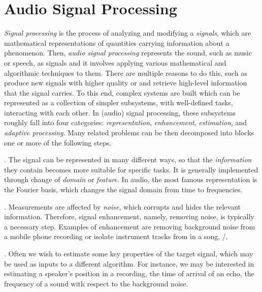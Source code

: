 \section{Audio Signal Processing}\label{sec:intro:processing}
\textit{Signal processing} is the process of analyzing and modifying a \textit{signals}, which are mathematical representations of quantities carrying information about a phenomenon.
Then, \textit{audio signal processing} represents the sound, such as music or speech, as signals
 and it involves applying various mathematical and algorithmic techniques to them.
There are multiple reasons to do this, such as produce new signals with higher quality or and retrieve high-level information that the signal carries.
To this end, complex systems are built which can be represented as a collection of simpler subsystems, with well-defined tasks, interacting with each other.
In (audio) signal processing, these subsystems roughly fall into four categories: \textit{representation}, \textit{enhancement}, \textit{estimation}, and \textit{adaptive processing}.
Many related problems can be then decomposed into blocks one or more of the following steps.

.
    The signal can be represented in many different ways, so that the \textit{information} they contain becomes more suitable for specific tasks.
    It is generally implemented through change of \textit{domain} or \textit{feature}.
    In audio, the most famous representation is the Fourier basis, which changes the signal domain from time to frequencies.

.
    Measurements are affected by \textit{noise}, which corrupts and hides the relevant information.
    Therefore, signal enhancement, namely, removing noise, is typically a necessary step.
    Examples of enhancement are removing background noise from a mobile phone recording or isolate instrument tracks from in a song, \etc/.

.
    Often we wish to estimate some key properties of the target signal, which may be used as inputs to a different algorithm.
    For instance, we may be interested in estimating a speaker's position in a recording, the time of arrival of an echo, the frequency of a sound with respect to the background noise.

